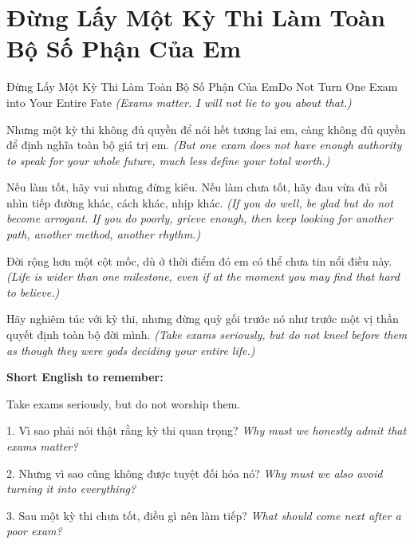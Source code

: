\section{Đừng Lấy Một Kỳ Thi Làm Toàn Bộ Số Phận Của Em}
\begin{truyen}{Đừng Lấy Một Kỳ Thi Làm Toàn Bộ Số Phận Của Em}{Do Not Turn One Exam into Your Entire Fate}
\textit{(Exams matter. I will not lie to you about that.)}

Nhưng một kỳ thi không đủ quyền để nói hết tương lai em, càng không đủ quyền để định nghĩa toàn bộ giá trị em.
\textit{(But one exam does not have enough authority to speak for your whole future, much less define your total worth.)}

Nếu làm tốt, hãy vui nhưng đừng kiêu. Nếu làm chưa tốt, hãy đau vừa đủ rồi nhìn tiếp đường khác, cách khác, nhịp khác.
\textit{(If you do well, be glad but do not become arrogant. If you do poorly, grieve enough, then keep looking for another path, another method, another rhythm.)}

Đời rộng hơn một cột mốc, dù ở thời điểm đó em có thể chưa tin nổi điều này.
\textit{(Life is wider than one milestone, even if at the moment you may find that hard to believe.)}
\end{truyen}

\begin{baihoc}
Hãy nghiêm túc với kỳ thi, nhưng đừng quỳ gối trước nó như trước một vị thần quyết định toàn bộ đời mình.
\textit{(Take exams seriously, but do not kneel before them as though they were gods deciding your entire life.)}
\end{baihoc}

\begin{ghinhoanh}
\textbf{Short English to remember:}

Take exams seriously, but do not worship them.

\end{ghinhoanh}

\begin{tuhocnhanh}
1. Vì sao phải nói thật rằng kỳ thi quan trọng? \textit{Why must we honestly admit that exams matter?}

2. Nhưng vì sao cũng không được tuyệt đối hóa nó? \textit{Why must we also avoid turning it into everything?}

3. Sau một kỳ thi chưa tốt, điều gì nên làm tiếp? \textit{What should come next after a poor exam?}
\end{tuhocnhanh}
\ngancach

